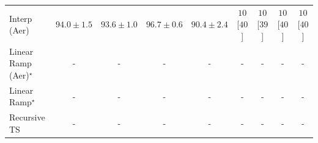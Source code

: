 \begin{tabular}{l|cccc|cccc|}
Interp (Aer) & {\cellcolor[HTML]{AE3E03}} \color[HTML]{F1F1F1} $94.0\pm 1.5$ & {\cellcolor[HTML]{B64203}} \color[HTML]{F1F1F1} $93.6\pm 1.0$ & {\cellcolor[HTML]{762A05}} \color[HTML]{F1F1F1} $96.7\pm 0.6$ & {\cellcolor[HTML]{E76B11}} \color[HTML]{F1F1F1} $90.4\pm 2.4$ & {\cellcolor[HTML]{FFF7F3}} \color[HTML]{000000} $10$ [$40$] & {\cellcolor[HTML]{FFF7F3}} \color[HTML]{000000} $10$ [$39$] & {\cellcolor[HTML]{FFF7F3}} \color[HTML]{000000} $10$ [$40$] & {\cellcolor[HTML]{FFF7F3}} \color[HTML]{000000} $10$ [$40$] \\
Linear Ramp (Aer)$^\star$ & {\cellcolor[HTML]{000000}} \color[HTML]{F1F1F1} {\cellcolor{white}} \color{black} - & {\cellcolor[HTML]{000000}} \color[HTML]{F1F1F1} {\cellcolor{white}} \color{black} - & {\cellcolor[HTML]{000000}} \color[HTML]{F1F1F1} {\cellcolor{white}} \color{black} - & {\cellcolor[HTML]{000000}} \color[HTML]{F1F1F1} {\cellcolor{white}} \color{black} - & {\cellcolor[HTML]{000000}} \color[HTML]{F1F1F1} {\cellcolor{white}} \color{black} - & {\cellcolor[HTML]{000000}} \color[HTML]{F1F1F1} {\cellcolor{white}} \color{black} - & {\cellcolor[HTML]{000000}} \color[HTML]{F1F1F1} {\cellcolor{white}} \color{black} - & {\cellcolor[HTML]{000000}} \color[HTML]{F1F1F1} {\cellcolor{white}} \color{black} - \\
Linear Ramp$^\star$ & {\cellcolor[HTML]{000000}} \color[HTML]{F1F1F1} {\cellcolor{white}} \color{black} - & {\cellcolor[HTML]{000000}} \color[HTML]{F1F1F1} {\cellcolor{white}} \color{black} - & {\cellcolor[HTML]{000000}} \color[HTML]{F1F1F1} {\cellcolor{white}} \color{black} - & {\cellcolor[HTML]{000000}} \color[HTML]{F1F1F1} {\cellcolor{white}} \color{black} - & {\cellcolor[HTML]{000000}} \color[HTML]{F1F1F1} {\cellcolor{white}} \color{black} - & {\cellcolor[HTML]{000000}} \color[HTML]{F1F1F1} {\cellcolor{white}} \color{black} - & {\cellcolor[HTML]{000000}} \color[HTML]{F1F1F1} {\cellcolor{white}} \color{black} - & {\cellcolor[HTML]{000000}} \color[HTML]{F1F1F1} {\cellcolor{white}} \color{black} - \\
Recursive TS & {\cellcolor[HTML]{000000}} \color[HTML]{F1F1F1} {\cellcolor{white}} \color{black} - & {\cellcolor[HTML]{000000}} \color[HTML]{F1F1F1} {\cellcolor{white}} \color{black} - & {\cellcolor[HTML]{000000}} \color[HTML]{F1F1F1} {\cellcolor{white}} \color{black} - & {\cellcolor[HTML]{000000}} \color[HTML]{F1F1F1} {\cellcolor{white}} \color{black} - & {\cellcolor[HTML]{000000}} \color[HTML]{F1F1F1} {\cellcolor{white}} \color{black} - & {\cellcolor[HTML]{000000}} \color[HTML]{F1F1F1} {\cellcolor{white}} \color{black} - & {\cellcolor[HTML]{000000}} \color[HTML]{F1F1F1} {\cellcolor{white}} \color{black} - & {\cellcolor[HTML]{000000}} \color[HTML]{F1F1F1} {\cellcolor{white}} \color{black} - \\

\end{tabular}
